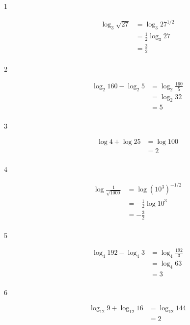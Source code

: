 \documentclass{exam}
\begin{document}
    \begin{description}

      \item[1] 
        \begin{align*}
          \log_3 \sqrt{27} &= \log_3 27^{1/2} \\
                           &= \frac{1}{2} \log_3 27 \\
                           &= \frac{3}{2} \\
        \end{align*}

      \item[2] 
        \begin{align*}
          \log_2 160 - \log_2 5 &= \log_2 \frac{160}{5} \\
                                &= \log_2 32 \\
                                &= 5 \\
        \end{align*}

      \item[3] 
        \begin{align*}
          \log 4 + \log 25 &= \log 100 \\
                           &= 2 \\
        \end{align*}

      \item[4] 
        \begin{align*}
          \log \frac{1}{\sqrt{1000}} &= \log \left( 10^3 \right)^{-1/2} \\
                                     &= - \frac{1}{2} \log 10^3 \\
                                     &= -\frac{3}{2} \\
        \end{align*}

      \item[5] 
        \begin{align*}
          \log_4 192 - \log_4 3 &= \log_4 \frac{192}{3} \\
                                &= \log_4 63 \\
                                &= 3 \\
        \end{align*}

      \item[6] 
        \begin{align*}
          \log_{12} 9 + \log_{12} 16 &= \log_{12} 144 \\
                                     &= 2 \\
        \end{align*}


\end{description}
\end{document}
